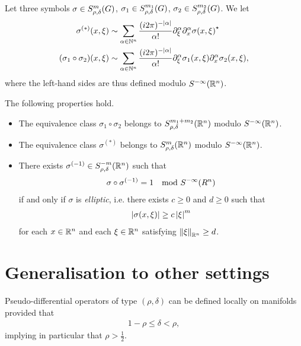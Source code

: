 \begin{theorem}
    Let three symbols
    $\sigma \in \SymbolClass m {\rho, \delta}$,
    $\sigma_1 \in \SymbolClass {m_1} {\rho, \delta}$,
    $\sigma_2 \in \SymbolClass {m_2} {\rho, \delta}$.
    We let
    \begin{align*}
        \sigma^{(*)}(x, \xi) &\sim \sum_{\alpha \in \N^n} \frac {(\i \turn)^{-\abs \alpha}} {\alpha!} \iD{\xi^\alpha} \iD{x^\alpha} \adj{\sigma(x, \xi)}\\
        (\sigma_1 \circ \sigma_2)(x, \xi) &\sim \sum_{\alpha \in \N^n} \frac {(\i \turn)^{-\abs \alpha}} {\alpha!} \iD{\xi^\alpha} \sigma_1(x, \xi) \iD{x^\alpha} \sigma_2(x, \xi),
    \end{align*}
    where the left-hand sides are thus defined modulo $\SmoothingSymbols [\R^n]$.

    The following properties hold.
    \begin{itemize}
        \item The equivalence class $\sigma_1 \circ \sigma_2$ belongs to $\SymbolClass [\R^n] {m_1 + m_2} {\rho, \delta}$ modulo $\SmoothingSymbols [\R^n]$.
        \item The equivalence class $\sigma^{(*)}$ belongs to $\SymbolClass [\R^n] m {\rho, \delta}$ modulo $\SmoothingSymbols [\R^n]$.
        \item
            There exists $\sigma^{(-1)} \in \SymbolClass [\R^n] {-m} {\rho, \delta}$ such that
            \begin{align*}
                \sigma \circ \sigma^{(-1)} = 1 \quad \text{mod } \SmoothingSymbols [R^n]
            \end{align*}
            if and only if $\sigma$ is \emph{elliptic},
            i.e. there exists $c \geq 0$ and $d \geq 0$ such that
            \begin{align*}
                \abs {\sigma(x, \xi)} \geq c \abs \xi^m
            \end{align*}
            for each $x \in \R^n$ and each $\xi \in \R^n$ satisfying $\norm [\R^n] \xi \geq d$.
    \end{itemize}
\end{theorem}

\section{Generalisation to other settings}

Pseudo-differential operators of type $(\rho, \delta)$ can be defined locally on manifolds provided that
\begin{align*}
    1 - \rho \leq \delta < \rho,
\end{align*}
implying in particular that $\rho > \frac 1 2$.

